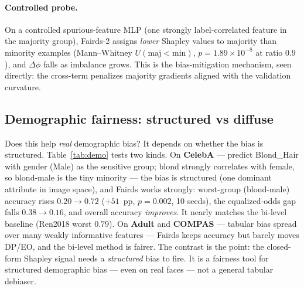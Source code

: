 \documentclass[letterpaper]{article}
\begin{document}
\paragraph{Controlled probe.}
On a controlled spurious-feature MLP (one strongly label-correlated feature in the
majority group), Fairds-2 assigns \emph{lower} Shapley values to majority than
minority examples (Mann--Whitney $U(\mathrm{maj}{<}\mathrm{min})$,
$p{=}1.89\times10^{-8}$ at ratio $0.9$), and $\Delta\phi$ falls as imbalance
grows. This is the bias-mitigation mechanism, seen directly: the cross-term
penalizes majority gradients aligned with the validation curvature.

\subsection{Demographic fairness: structured vs diffuse}
\label{sec:demographic}
Does this help \emph{real} demographic bias? It depends on whether the bias is
structured. Table~\ref{tab:demo} tests two kinds. On \textbf{CelebA} --- predict
Blond\_Hair with gender (Male) as the sensitive group; blond strongly correlates
with female, so blond-male is the tiny minority --- the bias is structured (one
dominant attribute in image space), and Fairds works strongly: worst-group
(blond-male) accuracy rises $0.20{\to}0.72$ ($+51$~pp, $p{=}0.002$, 10 seeds), the
equalized-odds gap falls $0.38{\to}0.16$, and overall accuracy \emph{improves}. It
nearly matches the bi-level baseline (Ren2018 worst $0.79$). On \textbf{Adult} and
\textbf{COMPAS} --- tabular bias spread over many weakly informative features ---
Fairds keeps accuracy but barely moves DP/EO, and the bi-level method is fairer.
The contrast is the point: the closed-form Shapley signal needs a \emph{structured}
bias to fire. It is a fairness tool for structured demographic bias --- even on
real faces --- not a general tabular debiaser.
\end{document}
